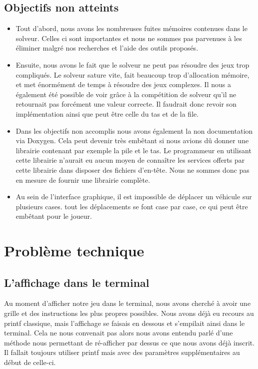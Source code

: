 \documentclass{article}
\begin{document}
\subsection {Objectifs non atteints}
\begin{itemize}
\item Tout d'abord, nous avons les nombreuses fuites mémoires contenues dans le solveur. Celles ci sont importantes et nous ne sommes pas parvenues à les éliminer malgré nos recherches et l'aide des outils proposés.\\

\item Ensuite, nous avons le fait que le solveur ne peut pas résoudre des jeux trop compliqués. Le solveur sature vite, fait beaucoup trop d'allocation mémoire, et met énormément de temps à résoudre des jeux complexes. Il nous a également été possible de voir grâce à la compétition de solveur qu'il ne retournait pas forcément une valeur correcte. Il faudrait donc revoir son implémentation ainsi que peut être celle du tas et de la file.\\

\item Dans les objectifs non accomplis nous avons également la non documentation via Doxygen. Cela peut devenir très embêtant si nous avions dû donner une librairie contenant par exemple la pile et le tas. Le programmeur en utilisant cette librairie n'aurait eu aucun moyen de connaître les services offerts par cette librairie dans disposer des fichiers d'en-tête. Nous ne sommes donc pas en mesure de fournir une librairie complète.\\

\item Au sein de l'interface graphique, il est impossible de déplacer un véhicule sur plusieurs cases. tout les déplacements se font case par case, ce qui peut être embêtant pour le joueur.

\end{itemize}

\section {Problème technique}
\subsection {L'affichage dans le terminal}
Au moment d'afficher notre jeu dans le terminal, nous avons cherché à avoir une grille et des instructions les plus propres possibles. Nous avons déjà eu recours au printf classique, mais l'affichage se faisais en dessous et s'empilait ainsi dans le terminal. Cela ne nous convenait pas alors nous avons entendu parlé d'une méthode nous permettant de ré-afficher par dessus ce que nous avons déjà inscrit. Il fallait toujours utiliser printf mais avec des paramètres supplémentaires au début de celle-ci.
\end{document}
